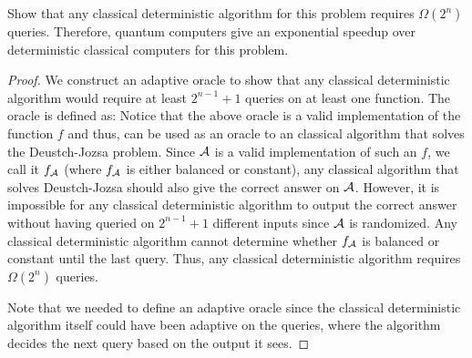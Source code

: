 \begin{solution}[label=ques:1b]
  \begin{question}
    Show that any classical deterministic algorithm for this problem requires $\Omega(2^n)$ queries. Therefore, quantum computers give an exponential speedup over
deterministic classical computers for this problem.
  \end{question}
  \tcblower{}
  \begin{proof}
    We construct an adaptive oracle to show that any classical deterministic algorithm would require at least $2^{n - 1} + 1$ queries on at least one function. The oracle is defined as:
    Notice that the above oracle is a valid implementation of the function $f$ and thus, can be used as an oracle to an classical algorithm that solves the Deustch-Jozsa problem. Since $\mathcal{A}$ is a valid implementation of such an $f$, we call it $f_{\mathcal{A}}$ (where $f_{\mathcal{A}}$ is either balanced or constant), any classical algorithm that solves Deustch-Jozsa should also give the correct answer on $\mathcal{A}$. However, it is impossible for any classical deterministic algorithm to output the correct answer without having queried on $2^{n-1} + 1$ different inputs since $\mathcal{A}$ is randomized. Any classical deterministic algorithm cannot determine whether $f_{\mathcal{A}}$ is balanced or constant until the last query. Thus, any classical deterministic algorithm requires $\Omega(2^n)$ queries.\par
    Note that we needed to define an adaptive oracle since the classical deterministic algorithm itself could have been adaptive on the queries, where the algorithm decides the next query based on the output it sees.
  \end{proof}
\end{solution}

